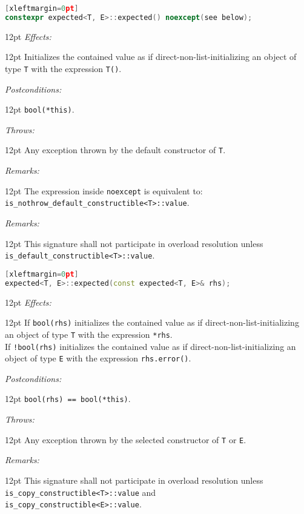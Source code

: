 \documentclass[a4paper,10pt]{article}
\newcommand{\cpp}[1]{\lstinline{#1}}
\newcommand{\wordingItem}[1]{\noindent\textit{#1:}}
\newenvironment{wordingTextItem}[1]{\wordingItem{#1}\vspace{2pt}\noindent\begin{adjustwidth}{12pt}{}}{\vspace{2pt}\end{adjustwidth}}
\newenvironment{wordingPara}{\begin{adjustwidth}{12pt}{}}{\end{adjustwidth}}
\begin{document}
\begin{lstlisting}[language=C++][xleftmargin=0pt]
constexpr expected<T, E>::expected() noexcept(see below);
\end{lstlisting}
\begin{wordingPara}
\begin{wordingTextItem}{Effects}
Initializes the contained value as if direct-non-list-initializing an object of type \cpp{T} with the expression \cpp{T()}.
\end{wordingTextItem}
\begin{wordingTextItem}{Postconditions}
\cpp{bool(*this)}.
\end{wordingTextItem}
\begin{wordingTextItem}{Throws}
Any exception thrown by the default constructor of \cpp{T}.
\end{wordingTextItem}
\begin{wordingTextItem}{Remarks}
The expression inside \cpp{noexcept} is equivalent to:\\
\cpp{is_nothrow_default_constructible<T>::value}.
\end{wordingTextItem}
\begin{wordingTextItem}{Remarks}
This signature shall not participate in overload resolution unless\\
 \cpp{is_default_constructible<T>::value}.
\end{wordingTextItem}


\end{wordingPara}

\begin{lstlisting}[language=C++][xleftmargin=0pt]
expected<T, E>::expected(const expected<T, E>& rhs);
\end{lstlisting}
\begin{wordingPara}
\begin{wordingTextItem}{Effects}
If \cpp{bool(rhs)} initializes the contained value as if direct-non-list-initializing an object of type \cpp{T} with the expression \cpp{*rhs}.\\

\noindent
If \cpp{!bool(rhs)} initializes the contained value as if direct-non-list-initializing an object of type \cpp{E} with the expression \cpp{rhs.error()}.
\end{wordingTextItem}
\begin{wordingTextItem}{Postconditions}
\cpp{bool(rhs) == bool(*this)}.
\end{wordingTextItem}
\begin{wordingTextItem}{Throws}
Any exception thrown by the selected constructor of \cpp{T} or \cpp{E}.
\end{wordingTextItem}
\begin{wordingTextItem}{Remarks}
This signature shall not participate in overload resolution unless\\
\cpp{is_copy_constructible<T>::value} and\\
\cpp{is_copy_constructible<E>::value}.
\end{wordingTextItem}
\end{wordingPara}
\end{document}
